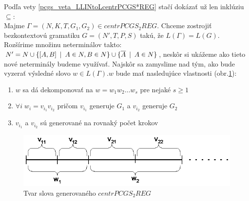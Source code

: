 \begin{dokaz}
  Podľa vety \ref{pcgs_veta_LLINtoLcentrPCGS*REG} stačí dokázať už len
  inklúziu $\subseteq$:
  \\ Majme $\Gamma=(N,K,T,G_1,G_2)\in centrPCGS_2REG$. Chceme
  zostrojiť bezkontextovú gramatiku $G=(N',T,P,S)$ takú, že
  $L(\Gamma)=L(G)$. Rozšírime množinu neterminálov takto:\\
  $N'=N\cup \{[A,B]\enspace |\enspace A\in N,B\in N\}\cup\{\overline{A}\enspace |\enspace A\in
  N\}$, neskôr si ukážeme ako tieto nové neterminály budeme
  využívať. Najskôr sa zamyslime nad tým, ako bude vyzerať výsledné
  slovo $w\in L(\Gamma)$.\linebreak $w$ bude mať nasledujúce
  vlastnosti (obr.\ref{pcgs_obr_l2reglcf}):

  \begin{enumerate}
    \item $w$ sa dá dekomponovať na $w=w_1w_2\dots w_s$ pre nejaké $s\geq 1$
    \item $\forall i\; w_i=v_{i_1}v_{i_2}$ pričom $v_{i_1}$ generuje $G_1$
    a $v_{i_2}$ generuje $G_2$
    \item $v_{i_1}$ a $v_{i_2}$ sú generované na rovnaký počet
    krokov
  \end{enumerate}

  \begin{figure}[ht]
    \centering
    \includegraphics{img/pcgs/l2reglcf}
    \caption{Tvar slova generovaného $centrPCGS_2REG$}\label{pcgs_obr_l2reglcf}
  \end{figure}


\end{dokaz}
